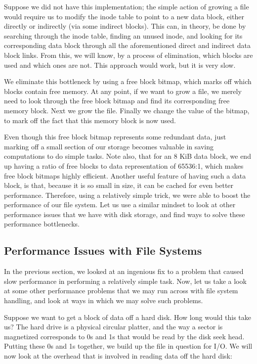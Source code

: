 \documentclass[a4paper]{article}
\begin{document}
Suppose we did not have this implementation; the simple action of growing a file would require us to modify the inode table to point to a new data block, either directly or indirectly (via some indirect blocks). This can, in theory, be done by searching through the inode table, finding an unused inode, and looking for its corresponding data block through all the aforementioned direct and indirect data block links. From this, we will know, by a process of elimination, which blocks are used and which ones are not. This approach would work, but it is very slow.

We eliminate this bottleneck by using a free block bitmap, which marks off which blocks contain free memory. At any point, if we want to grow a file, we merely need to look through the free block bitmap and find its corresponding free memory block. Next we grow the file. Finally we change the value of the bitmap, to mark off the fact that this memory block is now used.

Even though this free block bitmap represents some redundant data, just marking off a small section of our storage becomes valuable in saving computations to do simple tasks. Note also, that for an 8 KiB data block, we end up having a ratio of free blocks to data representation of 65536:1, which makes free block bitmaps highly efficient. Another useful feature of having such a data block, is that, because it is so small in size, it can be cached for even better performance. Therefore, using a relatively simple trick, we were able to boost the performance of our file system. Let us use a similar mindset to look at other performance issues that we have with disk storage, and find ways to solve these performance bottlenecks.

\subsection{Performance Issues with File Systems}

In the previous section, we looked at an ingenious fix to a problem that caused slow performance in performing a relatively simple task. Now, let us take a look at some other performance problems that we may run across with file system handling, and look at ways in which we may solve such problems.

Suppose we want to get a block of data off a hard disk. How long would this take us? The hard drive is a physical circular platter, and the way a sector is magnetized corresponds to 0s and 1s that would be read by the disk seek head. Putting these 0s and 1s together, we build up the file in question for I/O. We will now look at the overhead that is involved in reading data off the hard disk:
\end{document}
